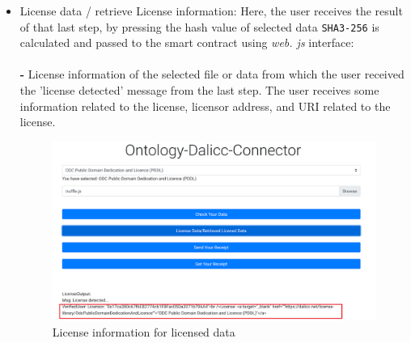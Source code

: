 \begin{itemize}
\begin{center}
\begin{figure}[htb!]
	\end{figure}
	
\end{center}
	\item License data / retrieve License information:
	Here, the user receives the result of that last step, by pressing the hash value of selected data \texttt{SHA3-256} is calculated and passed to the smart contract using \textit{web. js} interface: \\
    \\
	\textbf{- } License information of the selected file or data from which the user received the 'license detected' message from the last step. The user receives some information related to the license, licensor address, and URI related to the license.\\
    \begin{center}
	\begin{figure}[htb!]
		
		\begin{minipage}{0.55\linewidth}
			\centering
			\includegraphics[width=1.95\textwidth]{images/chap03_found_info.png}
		\end{minipage}
		\caption[License information for licensed data]{License information for licensed data}
		
	\end{figure}
	

\end{center}
\end{itemize}
